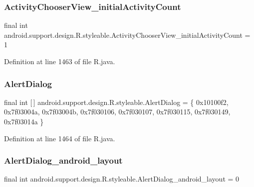 \subsubsection{\texorpdfstring{ActivityChooserView\_initialActivityCount}{ActivityChooserView\_initialActivityCount}}
{\footnotesize\ttfamily final int android.\+support.\+design.\+R.\+styleable.\+Activity\+Chooser\+View\+\_\+initial\+Activity\+Count = 1\hspace{0.3cm}{\ttfamily [static]}}



Definition at line 1463 of file R.\+java.

\mbox{\label{classandroid_1_1support_1_1design_1_1_r_1_1styleable_aeccb758d25f6e242e6f3a23f3873ec21}} 
\subsubsection{\texorpdfstring{AlertDialog}{AlertDialog}}
{\footnotesize\ttfamily final int \mbox{[}$\,$\mbox{]} android.\+support.\+design.\+R.\+styleable.\+Alert\+Dialog = \{ 0x10100f2, 0x7f03004a, 0x7f03004b, 0x7f030106, 0x7f030107, 0x7f030115, 0x7f030149, 0x7f03014a \}\hspace{0.3cm}{\ttfamily [static]}}



Definition at line 1464 of file R.\+java.

\mbox{\label{classandroid_1_1support_1_1design_1_1_r_1_1styleable_a71bc85e6ec9ee647058ddec18999bc91}} 
\subsubsection{\texorpdfstring{AlertDialog\_android\_layout}{AlertDialog\_android\_layout}}
{\footnotesize\ttfamily final int android.\+support.\+design.\+R.\+styleable.\+Alert\+Dialog\+\_\+android\+\_\+layout = 0\hspace{0.3cm}{\ttfamily [static]}}



